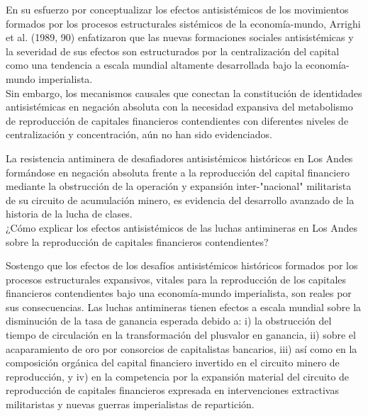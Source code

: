 \documentclass[
]{article}
\begin{document}
En su esfuerzo por conceptualizar los efectos antisistémicos de los
movimientos formados por los procesos estructurales sistémicos de la
economía-mundo, Arrighi et al. (1989, 90) enfatizaron que las nuevas
formaciones sociales antisistémicas y la severidad de sus efectos son
estructurados por la centralización del capital como una tendencia a
escala mundial altamente desarrollada bajo la economía-mundo
imperialista.\\
Sin embargo, los mecanismos causales que conectan la constitución de
identidades antisistémicas en negación absoluta con la necesidad
expansiva del metabolismo de reproducción de capitales financieros
contendientes con diferentes niveles de centralización y concentración,
aún no han sido evidenciados.

La resistencia antiminera de desafiadores antisistémicos históricos en
Los Andes formándose en negación absoluta frente a la reproducción del
capital financiero mediante la obstrucción de la operación y expansión
inter-"nacional" militarista de su circuito de acumulación minero, es
evidencia del desarrollo avanzado de la historia de la lucha de
clases.\\
¿Cómo explicar los efectos antisistémicos de las luchas antimineras en
Los Andes sobre la reproducción de capitales financieros contendientes?

Sostengo que los efectos de los desafíos antisistémicos históricos
formados por los procesos estructurales expansivos, vitales para la
reproducción de los capitales financieros contendientes bajo una
economía-mundo imperialista, son reales por sus consecuencias. Las
luchas antimineras tienen efectos a escala mundial sobre la disminución
de la tasa de ganancia esperada debido a: i) la obstrucción del tiempo
de circulación en la transformación del plusvalor en ganancia, ii) sobre
el acaparamiento de oro por consorcios de capitalistas bancarios, iii)
así como en la composición orgánica del capital financiero invertido en
el circuito minero de reproducción, y iv) en la competencia por la
expansión material del circuito de reproducción de capitales financieros
expresada en intervenciones extractivas militaristas y nuevas guerras
imperialistas de repartición.
\end{document}
